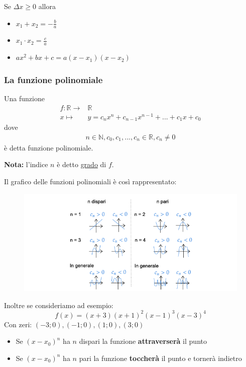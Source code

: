 \documentclass[../main.tex]{subfiles}
\begin{document}
Se $\Delta x \geq 0$ allora
\begin{itemize}
    \item $x_1 + x_2 = -\frac{b}{a}$
    \item $x_1 \cdot x_2 = \frac{c}{a}$
    \item $ax^2+bx+c = a(x-x_1)(x-x_2)$
\end{itemize}

\pagebreak
\subsubsection{La funzione polinomiale}
Una funzione
\begin{align*}
    f:\mathbb{R} \longrightarrow& \mathbb{R} \\
    x \longmapsto& y = c_nx^n + c_{n-1}x^{n-1} + ... + c_1x + c_0
\end{align*}
dove
\begin{align*}
    n \in \mathbb{N}, c_0,c_1, ..., c_n \in \mathbb{R}, c_n \neq 0
\end{align*}
è detta funzione polinomiale.

\textbf{Nota:} l'indice $n$ è detto \underline{grado} di $f$.

\vspace{1.5cm}
Il grafico delle funzioni polinomiali è così rappresentato:
\begin{figure}[h]
    \centering
    \includegraphics[width=1\textwidth]{images/funzioniPolinomiali.png}
\end{figure}

Inoltre se consideriamo ad esempio:
$$
    f(x) = (x+3)(x+1)^2(x-1)^3(x-3)^4
$$
Con zeri: $(-3;0), (-1;0), (1;0), (3;0)$

\begin{itemize}
    \item Se $(x-x_0)^n$ ha $n$ dispari la funzione \textbf{attraverserà} il punto
    \item Se $(x-x_0)^n$ ha $n$ pari la funzione \textbf{toccherà} il punto e tornerà indietro
\end{itemize}
\end{document}
